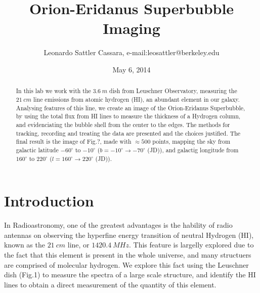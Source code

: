 \documentclass{article}
\begin{document}
\title{Orion-Eridanus Superbubble Imaging}
\author{Leonardo Sattler Cassara, e-mail:leosattler@berkeley.edu}
\date{May 6, 2014}
\maketitle

\begin{abstract}

In this lab we work with the $3.6 \ m$ dish from Leuschner Observatory,
measuring the $21 \ cm$ line emissions
from atomic hydrogen (HI), an abundant element in our galaxy. Analysing
features of this line, 
we create an image of the Orion-Eridanus Superbubble, by using the total
flux from HI lines to measure the thickness of a Hydrogen column, and
evidenciating the
bubble shell from the center to the edges. 
The methods for tracking, recording and treating the data
are presented and the choices justified. The final result is the image
of Fig.?, made with $\approx 500$ points, mapping the sky from galactic
latitude $-60^{\circ} $ 
to $-10^{\circ} $ ($b = -10^{\circ}  \rightarrow -70^{\circ}$ (JD)), 
and galactig longitude from $160 ^{\circ} $ 
to $220  ^{\circ}$ ($l = 160  ^{\circ} \rightarrow 220 ^{\circ}$ (JD)).

\end{abstract}

\section{Introduction}

In Radioastronomy, one of the greatest advantages is the hability of
radio antennas on observing the hyperfine energy 
transition of neutral Hydrogen (HI), known as the $21
\ cm$ line, or $1420.4 \ MHz$. This feature is largelly explored due to the fact that this
element is present in the whole universe, and many structuers are comprised of molecular hydrogen.
We explore this fact using the Leuschner dish (Fig.1) to measure the spectra of 
a large scale structure, and identify the HI lines to obtain a direct
measurement of the quantity of this element. 
\end{document}
